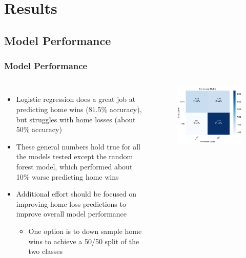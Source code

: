 \documentclass{beamer}
\begin{document}
\section{Results}

\subsection{Model Performance}
\begin{frame}
\frametitle{Model Performance}
\begin{columns}
\begin{itemize}
    \item Logistic regression does a great job at predicting home wins (81.5\% accuracy), but struggles with home losses (about 50\% accuracy)
    \item These general numbers hold true for all the models tested except the random forest model, which performed about 10\% worse predicting home wins
    \item Additional effort should be focused on improving home loss predictions to improve overall model performance
    \begin{itemize}
        \item One option is to down sample home wins to achieve a 50/50 split of the two classes
    \end{itemize}
\end{itemize}
\vspace{-0.5cm}
\begin{figure}
\includegraphics[scale=0.23]{../docs/assets/images/model-performance/logistic-regression-confusion-matrix.png}

\end{figure}
\end{columns}
\end{frame}
\end{document}
